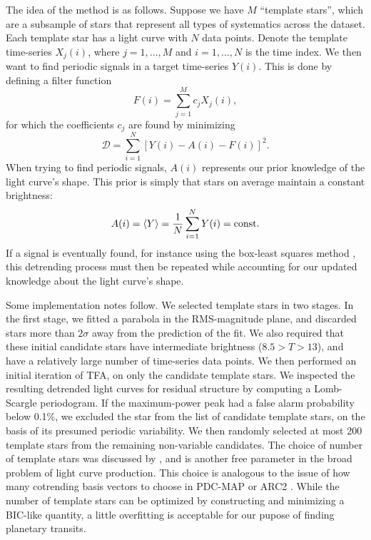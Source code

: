 \documentclass[12pt,twocolumn,tighten]{aastex62}
\begin{document}
The idea of the method is as follows.
Suppose we have $M$ ``template stars'', which are a subsample of
stars that represent all types of systematics across the dataset. 
Each template star has a light curve with $N$ data points.
Denote the template time-series $X_j(i)$, where $j={1,\ldots,M}$ and 
$i={1,\ldots,N}$ is the time index.
We then want to find periodic signals in a target time-series $Y(i)$.
This is done by defining a filter function
\begin{equation}
F(i) = \sum_{j=1}^{M} c_j X_j(i),
\end{equation}
for which the coefficients $c_j$ are found by minimizing
\begin{equation}
\mathcal{D} = \sum_{i=1}^{N} \left[ Y(i) - A(i) - F(i) \right]^2.
\label{eq:tfa_to_minimize}
\end{equation}
When trying to find periodic signals, $A(i)$ represents our prior
knowledge of the light curve's shape.
This prior is simply that stars on average maintain a constant brightness:
\begin{equation}
A(i) = \langle Y \rangle = \frac{1}{N} \sum_{i=1}^{N} Y(i) = {\rm const.}
\end{equation}
If a signal is eventually found, for instance using the box-least squares
method \citep{kovacs_box-fitting_2002},
this detrending process must then be repeated while accounting for our
updated knowledge about the light curve's shape.

Some implementation notes follow.
We selected template stars in two stages.
In the first stage, we fitted a parabola in the RMS-magnitude
plane, and discarded stars more than $2\sigma$ away from the
prediction of the fit.
We also required that these initial candidate stars have intermediate
brightness ($8.5 > T > 13$), and have a relatively large number
of time-series data points.
We then performed an initial iteration of TFA, on only the candidate
template stars.
We inspected the resulting detrended light curves for residual
structure by computing a Lomb-Scargle periodogram.
If the maximum-power peak had a false alarm probability below 0.1\%, 
we excluded the star from the list of candidate template stars, on the
basis of its presumed periodic variability.
We then randomly selected at most 200 template stars from the remaining
non-variable candidates. 
The choice of number of template stars was discussed by
\citet{kovacs_trend_2005}, and is another free parameter in
the broad problem of light curve production.
This choice is analogous to the issue of how many cotrending basis
vectors to choose in PDC-MAP or ARC2 \citep{aigrain_robust_2017}.
While the number of template stars can be optimized by constructing
and minimizing a BIC-like quantity, a little overfitting is acceptable
for our pupose of finding planetary transits.
\end{document}
